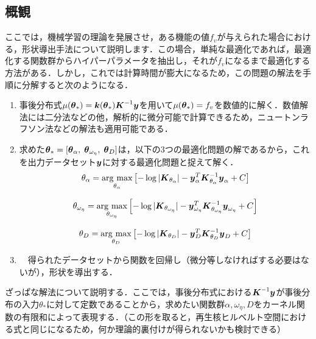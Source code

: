 \documentclass[11pt]{jsarticle}
\begin{document}
		\subsection{概観}
			ここでは，機械学習の理論を発展させ，ある機能の値$ f_v $が与えられた場合における，形状導出手法について説明します．この場合，単純な最適化であれば，最適化する関数群からハイパーパラメータを抽出し，それが$ f_v $になるまで最適化する方法がある．しかし，これでは計算時間が膨大になるため，この問題の解法を手順に分解すると次のようになる．
			\begin{enumerate}
				\item 事後分布式$ \mu(\boldsymbol{\theta}_*) = \boldsymbol{k}(\boldsymbol{\theta}_*)\boldsymbol{K}^{-1}\boldsymbol{y} $を用いて$ \mu(\boldsymbol{\theta}_*) = f_v $を数値的に解く．数値解法には二分法などの他，解析的に微分可能で計算できるため，ニュートンラフソン法などの解法も適用可能である．\label{enu:a1}
				\item 求めた$ \boldsymbol{\theta}_* =[\boldsymbol{\theta}_{\alpha},\; \boldsymbol{\theta}_{\omega_{\eta}},\; \boldsymbol{\theta}_{D}]$は，以下の3つの最適化問題の解であるから，これを出力データセット$ \boldsymbol{y} $に対する最適化問題と捉えて解く．\label{enu:a2}
				\begin{equation}\label{eq:Suudo1}
				\theta_{\alpha} =\mathop{\rm arg~max}\limits_{\theta_{\alpha}} \left[-\log|\boldsymbol{K}_{\theta_{\alpha}}| - \boldsymbol{y}_{\alpha}^T \boldsymbol{K}_{\theta_{\alpha}}^{-1} \boldsymbol{y}_{\alpha}+C \right] 
				\end{equation}
				
				\begin{equation}\label{eq:Suudo2}
				\theta_{\omega_{\eta}} =\mathop{\rm arg~max}\limits_{\theta_{\omega_{\eta}}} \left[-\log|\boldsymbol{K}_{\theta_{\omega_{\eta}}}| - \boldsymbol{y}_{\omega_{\eta}}^T \boldsymbol{K}_{\theta_{\omega_{\eta}}}^{-1} \boldsymbol{y}_{\omega_{\eta}} + C \right] 
				\end{equation}
				
				\begin{equation}\label{eq:Suudo3}
				\theta_{D} =\mathop{\rm arg~max}\limits_{\theta_{D}} \left[-\log|\boldsymbol{K}_{\theta_{D}}| - \boldsymbol{y}_{D}^T \boldsymbol{K}_{\theta_{D}}^{-1} \boldsymbol{y}_{D}+C \right] 
				\end{equation}
				
				\item　得られたデータセットから関数を回帰し（微分等しなければする必要はないが），形状を導出する．\label{enu:a3}
			\end{enumerate}
			ざっぱな解法について説明する．ここでは，事後分布式における$ \boldsymbol{K}^{-1}\boldsymbol{y} $が事後分布の入力$ \theta_* $に対して定数であることから，求めたい関数群$ \alpha,\omega_{\eta},D $をカーネル関数の有限和によって表現する．（この形を取ると，再生核ヒルベルト空間における式と同じになるため，何か理論的裏付けが得られないかも検討できる）
\end{document}
